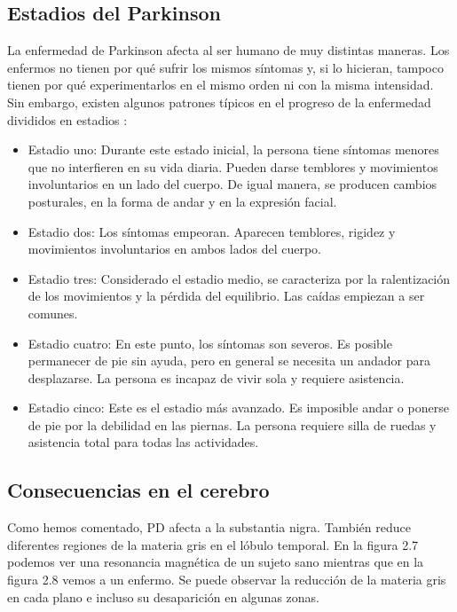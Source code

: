 \subsection{Estadios del Parkinson}

La enfermedad de Parkinson afecta al ser humano de muy distintas maneras. Los enfermos no tienen por qué sufrir los mismos síntomas y, si lo hicieran, tampoco tienen por qué experimentarlos en el mismo orden ni con la misma intensidad. Sin embargo, existen algunos patrones típicos en el progreso de la enfermedad divididos en estadios \cite{wp}:

\begin{itemize}
	\item Estadio uno: Durante este estado inicial, la persona tiene síntomas menores que no interfieren en su vida diaria. Pueden darse temblores y movimientos involuntarios en un lado del cuerpo. De igual manera, se producen cambios posturales, en la forma de andar y en la expresión facial.
	\item Estadio dos: Los síntomas empeoran. Aparecen temblores, rigidez y movimientos involuntarios en ambos lados del cuerpo.
	\item Estadio tres: Considerado el estadio medio, se caracteriza por la ralentización de los movimientos y la pérdida del equilibrio. Las caídas empiezan a ser comunes.
	\item Estadio cuatro: En este punto, los síntomas son severos. Es posible permanecer de pie sin ayuda, pero en general se necesita un andador para desplazarse. La persona es incapaz de vivir sola y requiere asistencia.
	\item Estadio cinco: Este es el estadio más avanzado. Es imposible andar o ponerse de pie por la debilidad en las piernas. La persona requiere silla de ruedas y asistencia total para todas las actividades.
\end{itemize}

\subsection{Consecuencias en el cerebro}

Como hemos comentado, PD afecta a la substantia nigra. También reduce diferentes regiones de la materia gris en el lóbulo temporal. En la figura 2.7 podemos ver una resonancia magnética de un sujeto sano mientras que en la figura 2.8 vemos a un enfermo. Se puede observar la reducción de la materia gris en cada plano  e incluso su desaparición en algunas zonas.

